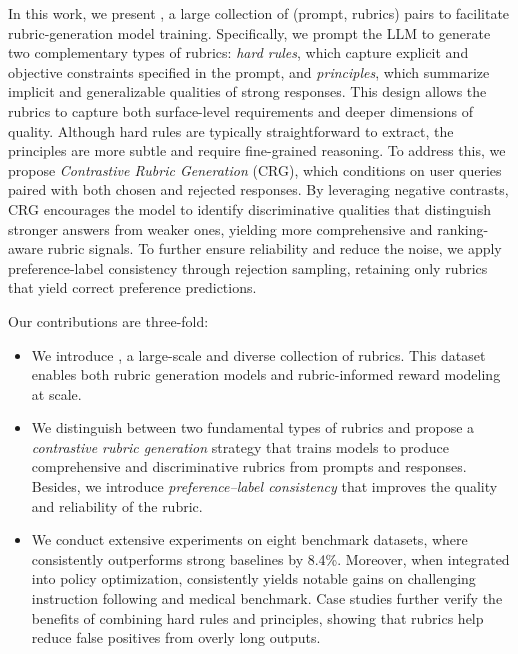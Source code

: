 In this work, we present \dataset{}, a large collection of (prompt, rubrics) pairs to facilitate rubric-generation model training. 
Specifically, we prompt the LLM to generate two complementary types of rubrics: \emph{hard rules}, which capture explicit and objective constraints specified in the prompt, and \emph{principles}, which summarize implicit and generalizable qualities of strong responses. This design allows the rubrics to capture both surface-level requirements and deeper dimensions of quality.
Although hard rules are typically straightforward to extract, the principles are more subtle and require fine-grained reasoning. To address this, we propose \emph{Contrastive Rubric Generation} (CRG), which conditions on user queries paired with both chosen and rejected responses. By leveraging negative contrasts, CRG encourages the model to identify discriminative qualities that distinguish stronger answers from weaker ones, yielding more comprehensive and ranking-aware rubric signals. 
To further ensure reliability and reduce the noise, we apply preference-label consistency through rejection sampling, retaining only rubrics that yield correct preference predictions.

Our contributions are three-fold:
\begin{itemize}[leftmargin=0.4cm]
\item We introduce \dataset{}, a large-scale and diverse collection of rubrics. This dataset enables both rubric generation models and rubric-informed reward modeling at scale.

\item We distinguish between two fundamental types of rubrics and propose a \emph{contrastive rubric generation} strategy that trains models to produce comprehensive and discriminative rubrics from prompts and responses. Besides, we introduce \emph{preference–label consistency} that improves the quality and reliability of the rubric.

\item We conduct extensive experiments on eight benchmark datasets, where \modelname{} consistently outperforms strong baselines by 8.4\%. Moreover, when integrated into policy optimization, \modelname{} consistently yields notable gains on challenging instruction following and medical benchmark.
Case studies further verify the benefits of combining hard rules and principles, showing that rubrics help reduce false positives from overly long outputs.
\end{itemize}